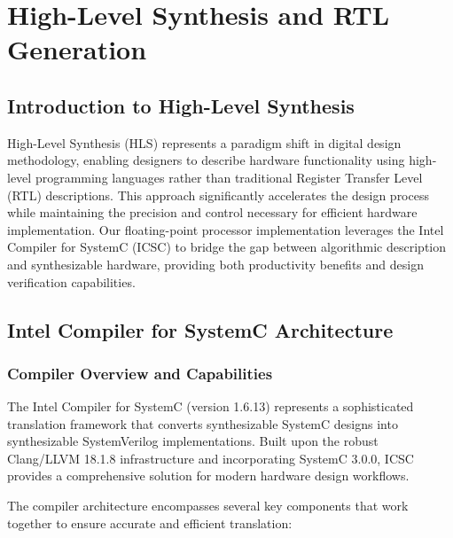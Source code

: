 
\chapter{High-Level Synthesis and RTL Generation}
\label{chap:rtl_translation}

\section{Introduction to High-Level Synthesis}
\label{sec:hls_introduction}

High-Level Synthesis (HLS) represents a paradigm shift in digital design methodology, enabling designers to describe hardware functionality using high-level programming languages rather than traditional Register Transfer Level (RTL) descriptions. This approach significantly accelerates the design process while maintaining the precision and control necessary for efficient hardware implementation. Our floating-point processor implementation leverages the Intel Compiler for SystemC (ICSC) to bridge the gap between algorithmic description and synthesizable hardware, providing both productivity benefits and design verification capabilities.

\section{Intel Compiler for SystemC Architecture}
\label{sec:icsc_architecture}

\subsection{Compiler Overview and Capabilities}
\label{subsec:icsc_overview}

The Intel Compiler for SystemC (version 1.6.13) represents a sophisticated translation framework that converts synthesizable SystemC designs into synthesizable SystemVerilog implementations. Built upon the robust Clang/LLVM 18.1.8 infrastructure and incorporating SystemC 3.0.0, ICSC provides a comprehensive solution for modern hardware design workflows.

The compiler architecture encompasses several key components that work together to ensure accurate and efficient translation:

